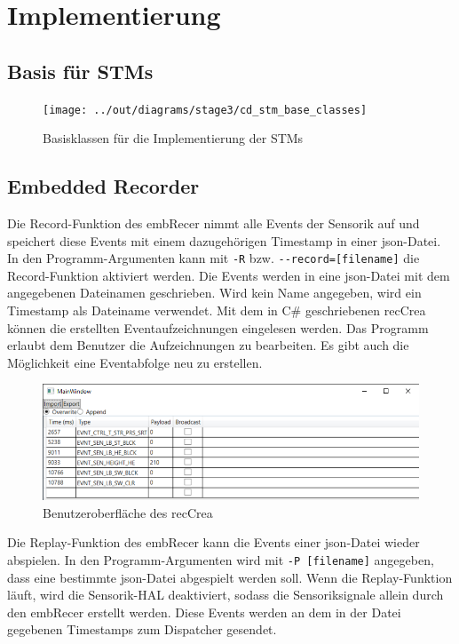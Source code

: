 \chapter{Implementierung}\label{ch:implementierung}



\section{Basis für STMs}\label{sec:basis-fuer-stms}

\begin{figure}[h]
    \centering
    \texttt{[image: ../out/diagrams/stage3/cd\_stm\_base\_classes]}
    \caption{Basisklassen für die Implementierung der STMs}
    \label{fig:cd-stm-base}
\end{figure}



\section{Embedded Recorder}\label{sec:embedded-recorder}

Die Record-Funktion des \gls{embRecer} nimmt alle Events der Sensorik auf und
speichert diese Events mit einem dazugehörigen Timestamp in einer json-Datei.
In den Programm-Argumenten kann mit \verb|-R| bzw.
\verb|--record=[filename]| die Record-Funktion aktiviert werden.
Die Events werden in eine json-Datei mit dem angegebenen Dateinamen geschrieben.
Wird kein Name angegeben, wird ein Timestamp als Dateiname verwendet.
Mit dem in C\# geschriebenen \gls{recCrea} können die erstellten
Eventaufzeichnungen
eingelesen werden.
Das Programm erlaubt dem Benutzer die Aufzeichnungen zu bearbeiten.
Es gibt auch die Möglichkeit eine Eventabfolge neu zu erstellen.
\begin{figure}[h]
    \centering
    \includegraphics[scale = 0.7]{anhang/EmbeddedRecordCreator.PNG}
    \caption{Benutzeroberfläche des \gls{recCrea}}
    \label{fig:embedded-record-creator}
\end{figure}

\FloatBarrier
\noindent Die Replay-Funktion des \gls{embRecer} kann die Events einer json-Datei wieder
abspielen.
In den Programm-Argumenten wird mit \verb|-P [filename]| angegeben, dass eine bestimmte json-Datei
abgespielt werden soll.
Wenn die Replay-Funktion läuft, wird die Sensorik-HAL deaktiviert,
sodass die Sensoriksignale allein durch den \gls{embRecer} erstellt werden.
Diese Events werden an dem in der Datei gegebenen Timestamps zum Dispatcher gesendet.
